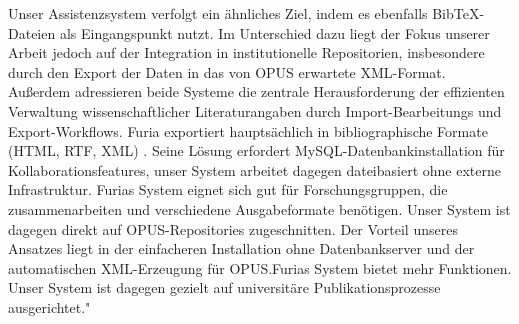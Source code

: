 Unser Assistenzsystem verfolgt ein ähnliches Ziel, indem es ebenfalls 
Bib\TeX{}-Dateien als Eingangspunkt nutzt. Im Unterschied dazu liegt der 
Fokus unserer Arbeit jedoch auf der Integration in institutionelle 
Repositorien, insbesondere durch den Export der Daten in das von OPUS 
erwartete XML-Format. Außerdem adressieren beide Systeme die zentrale Herausforderung der
effizienten Verwaltung wissenschaftlicher Literaturangaben durch Import-Bearbeitungs und Export-Workflows.
Furia exportiert  hauptsächlich in bibliographische Formate (HTML, RTF, XML) .
Seine Lösung erfordert MySQL-Datenbankinstallation für Kollaborationsfeatures, unser System arbeitet dagegen dateibasiert
ohne externe Infrastruktur.
Furias System eignet sich gut für Forschungsgruppen, die zusammenarbeiten und verschiedene Ausgabeformate benötigen.
Unser System ist dagegen direkt auf OPUS-Repositories zugeschnitten. Der Vorteil unseres Ansatzes liegt in der einfacheren
Installation ohne Datenbankserver und der automatischen XML-Erzeugung für OPUS.Furias System bietet mehr Funktionen. 
Unser System ist dagegen  gezielt auf universitäre Publikationsprozesse ausgerichtet."

